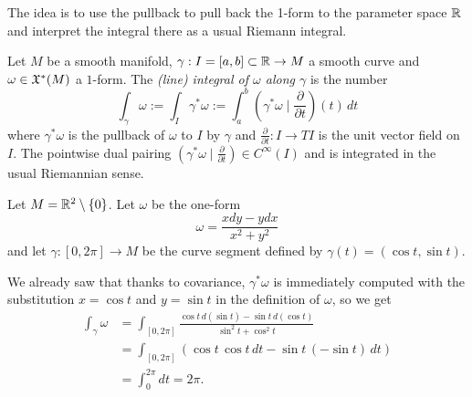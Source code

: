 The idea is to use the pullback to pull back the 1-form to the parameter space $\mathbb{R}$ and interpret the integral there as a usual Riemann integral.

\begin{definition}
	Let $M$ be a smooth manifold, $\gamma: I = [a,b]\subset \mathbb{R} \to M$ a smooth curve and $\omega\in\mathfrak{X}^*(M)$ a $1$-form.
	The \emph{(line) integral of $\omega$ along $\gamma$} is the number
	\begin{equation}
		\int_\gamma \omega :=
		\int_I \gamma^*\omega :=
		\int_a^b \left(\gamma^*\omega \mid \frac{\partial}{\partial t}\right)(t)\, dt
	\end{equation}
	where $\gamma^*\omega$ is the pullback of $\omega$ to $I$ by $\gamma$ and $\frac{\partial}{\partial t}: I \to TI$ is the unit vector field on $I$.
	The pointwise dual pairing $\left(\gamma^*\omega \mid \frac{\partial}{\partial t}\right)\in C^\infty(I)$ and is integrated in the usual Riemannian sense.
\end{definition}

\begin{example}\label{ex:li}
	Let $M=\mathbb{R}^2\setminus\{0\}$. Let $\omega$ be the one-form
	\begin{equation}
		\omega = \frac{x dy - y dx}{x^2 + y^2}
	\end{equation}
	and let $\gamma:[0,2\pi]\to M$ be the curve segment defined by $\gamma(t) = (\cos t, \sin t)$.

	We already saw that thanks to covariance, $\gamma^*\omega$ is immediately computed with the substitution $x=\cos t$ and $y=\sin t$ in the definition of $\omega$, so we get
	\begin{align}
		\int_\gamma \omega
		 & = \int_{[0,2\pi]} \frac{\cos t\, d(\sin t) - \sin t \, d(\cos t)}{\sin^2 t + \cos^2 t} \\
		 & = \int_{[0,2\pi]} (\cos t\, \cos t\, dt - \sin t \, (-\sin t)\, dt)                    \\
		 & = \int_0^{2\pi} dt = 2\pi.
	\end{align}
\end{example}

